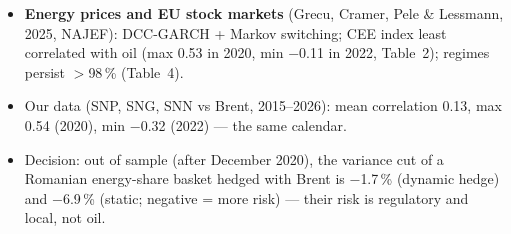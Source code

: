 \begin{itemize}\setlength{\itemsep}{2pt}
  \item \textbf{Energy prices and EU stock markets} (Grecu, Cramer, Pele \& Lessmann, 2025, NAJEF): DCC-GARCH + Markov switching; CEE index least correlated with oil (max 0.53 in 2020, min $-$0.11 in 2022, Table~2); regimes persist $>$98\,\% (Table~4).
  \item Our data (SNP, SNG, SNN vs Brent, 2015--2026): mean correlation 0.13, max 0.54 (2020), min $-$0.32 (2022) --- the same calendar.
  \item Decision: out of sample (after December 2020), the variance cut of a Romanian energy-share basket hedged with Brent is $-$1.7\,\% (dynamic hedge) and $-$6.9\,\% (static; negative = more risk) --- their risk is regulatory and local, not oil.
\end{itemize}
